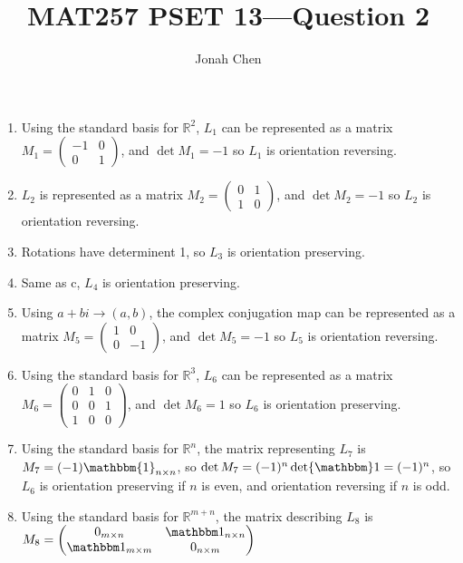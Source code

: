 \documentclass{exam}
\title{MAT257 PSET 13---Question 2}
\author{Jonah Chen}
\date{}
\numberwithin{equation}{section}
\newcommand{\R}{\mathbb{R}}
\begin{document}
    \sffamily
    \maketitle
    \begin{enumerate}[label=\alph*)]
        \item Using the standard basis for \(\R^2\), \(L_1\) can be represented as a matrix \(M_1=\begin{pmatrix}
            -1 & 0 \\
            0 & 1
        \end{pmatrix}\), and \(\det M_1=-1\) so \(L_1\) is orientation reversing.

        \item \(L_2\) is represented as a matrix \(M_2=\begin{pmatrix}
            0 & 1 \\
            1 & 0
        \end{pmatrix}\), and \(\det M_2=-1\) so \(L_2\) is orientation reversing.

        \item Rotations have determinent 1, so \(L_3\) is orientation preserving.
        \item Same as c, \(L_4\) is orientation preserving.
        \item Using \(a+bi\to (a,b)\), the complex conjugation map can be represented as a matrix \(M_5=\begin{pmatrix}
            1 & 0 \\
            0 & -1
        \end{pmatrix}\), and \(\det M_5=-1\) so \(L_5\) is orientation reversing.
        
        \item Using the standard basis for \(\R^3\), \(L_6\) can be represented as a matrix \(M_6=\begin{pmatrix}
            0 & 1 & 0 \\
            0 & 0 & 1 \\
            1 & 0 & 0
        \end{pmatrix}\), and \(\det M_6=1\) so \(L_6\) is orientation preserving.

        \item Using the standard basis for \(\R^n\), the matrix representing \(L_7\) is \(M_7=(-1)\mathbbm{1}_{n\times n}\), so \(\det M_7=(-1)^n\det\mathbbm 1=(-1)^n\), so \(L_6\) is orientation preserving if \(n\) is even, and orientation reversing if \(n\) is odd.
        \item Using the standard basis for \(\R^{m+n}\), the matrix describing \(L_8\) is \(M_8=\begin{pmatrix}
            0_{m\times n} & \mathbbm 1_{n\times n}\\
            \mathbbm 1_{m\times m} & 0_{n\times m}
        \end{pmatrix}\)


\end{enumerate}
\end{document}
